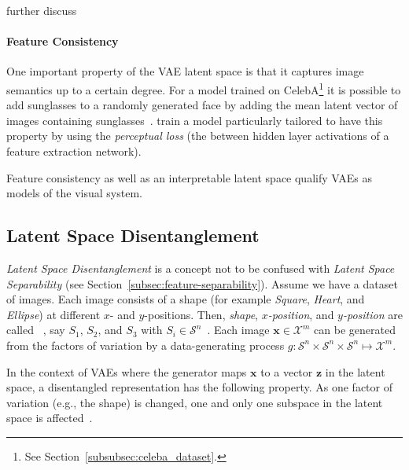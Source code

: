 \citet{tschannen2018recent} further discuss 

\paragraph{Feature Consistency}

One important property of the \ac{VAE} latent space is that it captures image semantics up to a certain degree.
For a model trained on CelebA\footnote{See Section~\ref{subsubsec:celeba_dataset}.} it is possible to add sunglasses to a randomly generated face by adding the mean latent vector of images containing sunglasses~\citep{larsen2015autoencoding,radford2016deep,hou2017deep}.
\citet{hou2017deep} train a model particularly tailored to have this property by using the \textit{perceptual loss} (the between hidden layer activations of a feature extraction network).

Feature consistency as well as an interpretable latent space qualify \acp{VAE} as models of the visual system.

\subsection{Latent Space Disentanglement}\label{subsec:feature-disentanglement}
\textit{Latent Space Disentanglement} is a concept not to be confused with \textit{Latent Space Separability} (see Section~\ref{subsec:feature-separability}).
Assume we have a dataset of images.
Each image consists of a shape (for example \textit{Square}, \textit{Heart}, and \textit{Ellipse}) at different $x$- and $y$-positions.
Then, \textit{shape}, $x$\textit{-position}, and $y$\textit{-position} are called ~\citep{Shu2020Weakly,higgins2018towards}, say $S_1$, $S_2$, and $S_3$ with $S_i\in \mathcal{S}^n$~\citep{Shu2020Weakly}.
Each image $\bm{x}\in \mathcal{X}^m$ can be generated from the factors of variation by a data-generating process $g: \mathcal{S}^n\times \mathcal{S}^n\times \mathcal{S}^n\mapsto \mathcal{X}^m$.

In the context of \acp{VAE} where the generator maps $\bm{x}$ to a vector $\bm{z}$ in the latent space, a disentangled representation has the following property.
As one factor of variation (e.g., the shape) is changed, one and only one subspace in the latent space is affected~\citep{higgins2018towards}.

